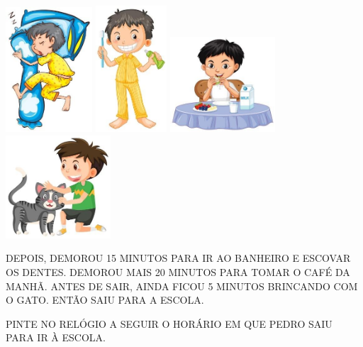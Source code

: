 \includegraphics[width=1.27248in,height=1.83120in]{media/image40.jpg}
\includegraphics[width=1.04250in,height=1.85399in]{media/image41.jpg}
\includegraphics[width=1.54748in,height=1.39171in]{media/image42.jpg}
\includegraphics[width=1.54490in,height=1.51274in]{media/image43.jpg}

DEPOIS, DEMOROU 15 MINUTOS PARA IR AO BANHEIRO E ESCOVAR OS DENTES.
DEMOROU MAIS 20 MINUTOS PARA TOMAR O CAFÉ DA MANHÃ. ANTES DE SAIR,
AINDA FICOU 5 MINUTOS BRINCANDO COM O GATO. ENTÃO SAIU PARA A ESCOLA.

PINTE NO RELÓGIO A SEGUIR O HORÁRIO EM QUE PEDRO SAIU PARA IR À ESCOLA.


